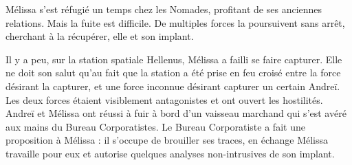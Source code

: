 Mélissa s'est réfugié un temps chez les Nomades, profitant de ses anciennes relations. Mais la fuite est difficile. De multiples forces la poursuivent sans arrêt, cherchant à la récupérer, elle et son implant.

Il y a peu, sur la station spatiale Hellenus, Mélissa a failli se faire capturer. Elle ne doit son salut qu'au fait que la station a été prise en feu croisé entre la force désirant la capturer, et une force inconnue désirant capturer un certain Andreï. Les deux forces étaient visiblement antagonistes et ont ouvert les hostilités. Andreï et Mélissa ont réussi à fuir à bord d'un vaisseau marchand qui s'est avéré aux mains du Bureau Corporatistes. Le Bureau Corporatiste a fait une proposition à Mélissa : il s'occupe de brouiller ses traces, en échange Mélissa travaille pour eux et autorise quelques analyses non-intrusives de son implant. 

\clearpage

